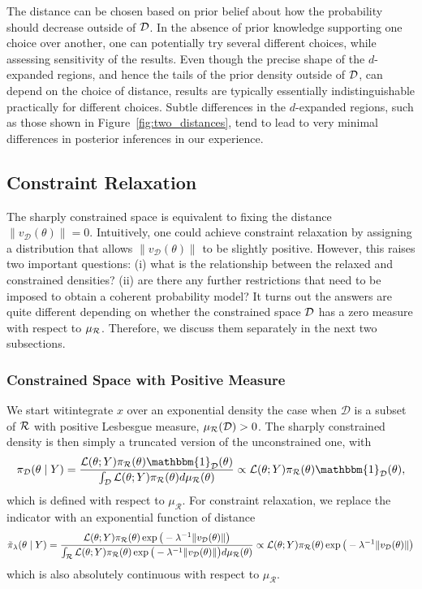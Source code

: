 \documentclass[10pt,fleqn]{article}
\DeclareMathOperator{\1}{\mathbbm{1}} \DeclareMathOperator{\bigO}{\mc O}
\begin{document}
The distance can be chosen based on prior belief about how the probability should decrease outside of $\mathcal{D}$.  In the absence of prior knowledge supporting one choice over another, one can potentially try several different choices, while assessing sensitivity of the results.  Even though the precise shape of the $d$-expanded regions, and hence the tails of the prior density outside of $\mathcal{D}$, can depend on the choice of distance, results are typically essentially indistinguishable practically for different choices.  Subtle differences in the $d$-expanded regions, such as those shown in Figure~\ref{fig:two_distances}, tend to lead to very minimal differences in posterior inferences in our experience.

\subsection{Constraint Relaxation}

The sharply constrained space is equivalent to fixing the distance $\|v_\mathcal{D}(\theta)\| = 0$. Intuitively,
one could achieve constraint relaxation by assigning
a distribution that allows $\|v_\mathcal{D}(\theta)\|$ to be slightly positive. However, this raises two important questions: (i) what is the relationship between the relaxed and constrained
densities? (ii) are there any further restrictions that need to be imposed to obtain a coherent probability model?  It turns out the answers are quite different depending
on whether the constrained space $\mathcal{D}$ has a zero
measure with respect to $\mu_{\mathcal{R}}$. Therefore, we
discuss them separately in the next two subsections.

\subsubsection{Constrained Space with Positive Measure}

We start witintegrate $x$ over an exponential density 
the case when $\mathcal{D}$ is a subset of $\mathcal{R}$ with positive Lesbesgue measure, $\mu_\mathcal{R}(\mathcal{D})>0$.  The sharply constrained density is then simply a truncated version of the unconstrained one, with
$$\pi_\mathcal{D}(\theta\mid Y) = \frac{\mathcal{L}(\theta; Y)
\pi_\mathcal{R}(\theta)\mathbbm{1}_\mathcal{D}(\theta)}{\int_\mathcal{D}
\mathcal{L}(\theta; Y)
\pi_\mathcal{R}(\theta)d\mu_\mathcal{R}(\theta)}\propto \mathcal{L}(\theta;
Y) \pi_\mathcal{R}(\theta)\mathbbm{1}_\mathcal{D}(\theta), $$
which is defined with respect to $\mu_\mathcal{R}$. 
For constraint relaxation, we replace the indicator with an exponential function of distance
\begin{equation}
\label{EQ:relaxedDensityPosMeasure}
\tilde{\pi}_\lambda(\theta \mid Y) =
\frac{\mathcal{L}(\theta;
Y)\pi_\mathcal{R}(\theta)\exp\big(-
\lambda^{-1}{\|v_{\mathcal{D}}(\theta)\|}\big)}{\int_{\mathcal{R}}\mathcal{L}(\theta; Y)
\pi_\mathcal{R}(\theta)\exp\big(-{\lambda^{-1}}{\|v_{\mathcal{D}}(\theta)\|}\big)
d\mu_\mathcal{R}(\theta)} \propto
\mathcal{L}(\theta; Y)
\pi_\mathcal{R}(\theta)\exp\big(-{\lambda^{-1}}{\|v_{\mathcal{D}}(\theta)\|}\big)
\end{equation}
which is also absolutely continuous with respect to $\mu_\mathcal{R}.$  
\end{document}
